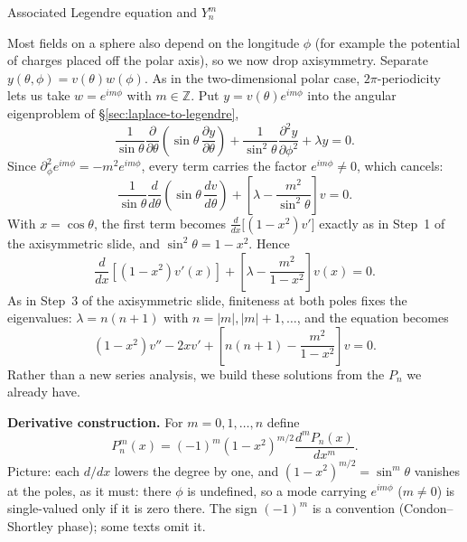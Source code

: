 \documentclass[11pt]{beamer}
\begin{document}
\begin{frame}[allowframebreaks=1.00]{Associated Legendre equation and $Y_n^m$}
\footnotesize

Most fields on a sphere also depend on the longitude $\phi$ (for example the potential of
charges placed off the polar axis), so we now drop axisymmetry.
Separate $y(\theta,\phi)=v(\theta)w(\phi)$. As in the two-dimensional polar case,
$2\pi$-periodicity lets us take $w=e^{im\phi}$ with $m\in\mathbb Z$.
Put $y=v(\theta)e^{im\phi}$ into the angular eigenproblem of \S\ref{sec:laplace-to-legendre},
\[
  \frac{1}{\sin\theta}
    \frac{\partial}{\partial\theta}
      \left(\sin\theta\,\frac{\partial y}{\partial\theta}\right)
  +\frac{1}{\sin^2\theta}\frac{\partial^2y}{\partial\phi^2}
  +\lambda y=0 .
\]
Since $\partial_\phi^2e^{im\phi}=-m^2e^{im\phi}$, every term carries the factor $e^{im\phi}\neq0$,
which cancels:
\[
  \frac{1}{\sin\theta}
    \frac{d}{d\theta}
      \left(\sin\theta\,\frac{dv}{d\theta}\right)
  +\left[\lambda-\frac{m^2}{\sin^2\theta}\right]v=0 .
\]
With $x=\cos\theta$, the first term becomes $\frac{d}{dx}\bigl[(1-x^2)v'\bigr]$ exactly as in
Step~1 of the axisymmetric slide, and $\sin^2\theta=1-x^2$. Hence
\begin{equation}
  \frac{d}{dx}\left[(1-x^2)v'(x)\right]
  +\left[
      \lambda-\frac{m^2}{1-x^2}
   \right]v(x)=0.
  \label{eq:assoc-legendre-general}
\end{equation}
As in Step~3 of the axisymmetric slide, finiteness at both poles fixes the eigenvalues:
$\lambda=n(n+1)$ with $n=|m|,|m|+1,\ldots$, and the equation becomes
\begin{equation}
 (1-x^2)v''-2xv'+\left[n(n+1)-\frac{m^2}{1-x^2}\right]v=0.
 \label{eq:assoc-legendre-expanded}
\end{equation}
Rather than a new series analysis, we build these solutions from the $P_n$ we already have.

\textbf{Derivative construction.} For $m=0,1,\ldots,n$ define
\begin{equation}
 P_n^m(x)=(-1)^m(1-x^2)^{m/2}\frac{d^mP_n(x)}{dx^m}.
 \label{eq:associated-legendre-definition}
\end{equation}
Picture: each $d/dx$ lowers the degree by one, and $(1-x^2)^{m/2}=\sin^m\theta$ vanishes at the
poles, as it must: there $\phi$ is undefined, so a mode carrying $e^{im\phi}$ ($m\ne0$) is
single-valued only if it is zero there. The sign $(-1)^m$ is a convention
(Condon--Shortley phase); some texts omit it.

\end{frame}
\end{document}
